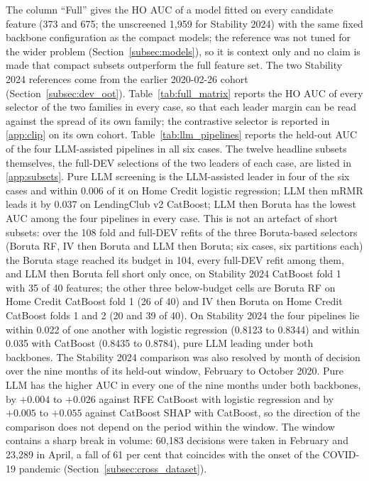 \documentclass[final,5p,twocolumn]{elsarticle}
\begin{document}
The column ``Full'' gives the HO AUC of a model fitted on every candidate feature (373 and 675; the unscreened 1,959 for Stability 2024) with the same fixed backbone configuration as the compact models; the reference was not tuned for the wider problem (Section~\ref{subsec:models}), so it is context only and no claim is made that compact subsets outperform the full feature set. The two Stability 2024 references come from the earlier 2020-02-26 cohort (Section~\ref{subsec:dev_oot}). Table~\ref{tab:full_matrix} reports the HO AUC of every selector of the two families in every case, so that each leader margin can be read against the spread of its own family; the contrastive selector is reported in \ref{app:clip} on its own cohort. Table~\ref{tab:llm_pipelines} reports the held-out AUC of the four LLM-assisted pipelines in all six cases. The twelve headline subsets themselves, the full-DEV selections of the two leaders of each case, are listed in \ref{app:subsets}. Pure LLM screening is the LLM-assisted leader in four of the six cases and within 0.006 of it on Home Credit logistic regression; LLM then mRMR leads it by 0.037 on LendingClub v2 CatBoost; LLM then Boruta has the lowest AUC among the four pipelines in every case. This is not an artefact of short subsets: over the 108 fold and full-DEV refits of the three Boruta-based selectors (Boruta RF, IV then Boruta and LLM then Boruta; six cases, six partitions each) the Boruta stage reached its budget in 104, every full-DEV refit among them, and LLM then Boruta fell short only once, on Stability 2024 CatBoost fold 1 with 35 of 40 features; the other three below-budget cells are Boruta RF on Home Credit CatBoost fold 1 (26 of 40) and IV then Boruta on Home Credit CatBoost folds 1 and 2 (20 and 39 of 40). On Stability 2024 the four pipelines lie within 0.022 of one another with logistic regression (0.8123 to 0.8344) and within 0.035 with CatBoost (0.8435 to 0.8784), pure LLM leading under both backbones. The Stability 2024 comparison was also resolved by month of decision over the nine months of its held-out window, February to October 2020. Pure LLM has the higher AUC in every one of the nine months under both backbones, by $+0.004$ to $+0.026$ against RFE CatBoost with logistic regression and by $+0.005$ to $+0.055$ against CatBoost SHAP with CatBoost, so the direction of the comparison does not depend on the period within the window. The window contains a sharp break in volume: 60,183 decisions were taken in February and 23,289 in April, a fall of 61 per cent that coincides with the onset of the COVID-19 pandemic (Section~\ref{subsec:cross_dataset}).
\end{document}
